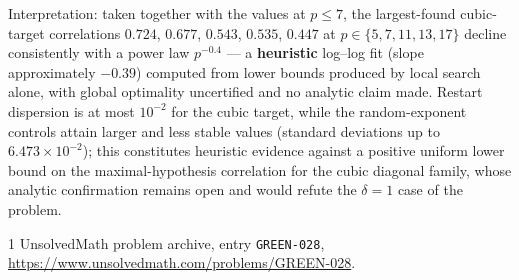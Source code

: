 \documentclass[11pt]{article}
\begin{document}
Interpretation: taken together with the values at $p\le7$, the largest-found
cubic-target correlations $0.724$, $0.677$, $0.543$, $0.535$, $0.447$ at
$p\in\{5,7,11,13,17\}$ decline consistently with a power law $p^{-0.4}$ — a
\textbf{heuristic} log--log fit (slope approximately $-0.39$) computed from
lower bounds produced by local search alone, with global optimality
uncertified and no analytic claim made. Restart dispersion is at most
$10^{-2}$ for the cubic target, while the random-exponent controls attain
larger and less stable values (standard deviations up to
$6.473\times10^{-2}$); this constitutes heuristic evidence against a
positive uniform lower bound on the maximal-hypothesis correlation for the
cubic diagonal family, whose analytic confirmation remains open and would
refute the $\delta=1$ case of the problem.


\begin{thebibliography}{1}
 UnsolvedMath problem archive, entry \texttt{GREEN-028},
\url{https://www.unsolvedmath.com/problems/GREEN-028}.
\end{thebibliography}
\end{document}
